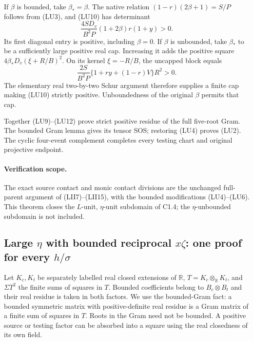 If $\beta$ is bounded, take $\beta_*=\beta$.  The native relation
$(1-r)(2\beta+1)=S/P$ follows from (LU3), and (LU10) has determinant
\[
 \frac{4S D_v}{B^2P}(1+2\beta)r(1+y)>0.                 \tag{LU11}
\]
Its first diagonal entry is positive, including $\beta=0$.
If $\beta$ is unbounded, take $\beta_*$ to be a sufficiently large
positive real cap.  Increasing it adds the positive square
$4\beta_*D_v(\xi+R/B)^2$.  On its kernel $\xi=-R/B$,
the uncapped block equals
\[
          \frac{2S}{B^2P}\{1+ry+(1-r)V\}R^2>0.           \tag{LU12}
\]
The elementary real two-by-two Schur argument therefore supplies
a finite cap making (LU10) strictly positive.  Unboundedness of the
original $\beta$ permits that cap.

Together (LU9)--(LU12) prove strict positive residue of the full
five-root Gram.  The bounded Gram lemma gives its tensor SOS;
restoring (LU4) proves (LU2).  The cyclic four-event complement
completes every testing chart and original projective endpoint.

\paragraph{Verification scope.}
  The exact source contact and
monic contact divisions are the unchanged full-parent argument of
(LII7)--(LII15), with the bounded modifications (LU4)--(LU6).
This theorem closes the $L$-unit, $\eta$-unit subdomain of C1.4;
the $\eta$-unbounded subdomain is not included.



\subsection{Large $\eta$ with bounded reciprocal $x\zeta$: one proof for every $h/\sigma$}
\label{sec:c1-unification-bounded-z-all-H}

Let $K_c,K_t$ be separately labelled real closed extensions of $\mathbb R$,
$T=K_c\otimes_{\mathbb R}K_t$, and $\Sigma T^2$ the finite sums of
squares in $T$. Bounded coefficients belong to $B_c\otimes B_t$ and
their real residue is taken in both factors. We use the bounded-Gram
fact: a bounded symmetric matrix with positive-definite real residue
is a Gram matrix of a finite sum of squares in $T$. Roots in the Gram
need not be bounded. A positive source or testing factor can be absorbed
into a square using the real closedness of its own field.

